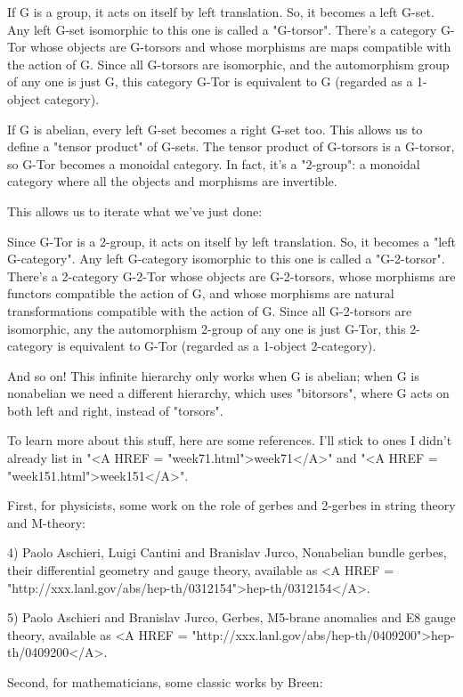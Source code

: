If G is a group, it acts on itself by left translation.  So, it
becomes a left G-set.  Any left G-set isomorphic to this one is called
a "G-torsor".  There's a category G-Tor whose objects are
G-torsors and whose morphisms are maps compatible with the action of
G.  Since all G-torsors are isomorphic, and the automorphism group of
any one is just G, this category G-Tor is equivalent to G (regarded as
a 1-object category).

If G is abelian, every left G-set becomes a right G-set too.  This
allows us to define a "tensor product" of G-sets.  The
tensor product of G-torsors is a G-torsor, so G-Tor becomes a monoidal
category.  In fact, it's a "2-group": a monoidal category
where all the objects and morphisms are invertible.

This allows us to iterate what we've just done:

Since G-Tor is a 2-group, it acts on itself by left translation.  So,
it becomes a "left G-category".  Any left G-category
isomorphic to this one is called a "G-2-torsor".  There's a
2-category G-2-Tor whose objects are G-2-torsors, whose morphisms are
functors compatible the action of G, and whose morphisms are natural
transformations compatible with the action of G.  Since all
G-2-torsors are isomorphic, any the automorphism 2-group of any one is
just G-Tor, this 2-category is equivalent to G-Tor (regarded as a
1-object 2-category).

And so on!  This infinite hierarchy only works when G is abelian;
when G is nonabelian we need a different hierarchy, which uses 
"bitorsors", where G acts on both left and right, instead 
of "torsors".  

To learn more about this stuff, here are some references.  I'll stick
to ones I didn't already list in "<A HREF =
"week71.html">week71</A>" and "<A HREF =
"week151.html">week151</A>".

First, for physicists, some work on the role of gerbes and 2-gerbes in 
string theory and M-theory:

4) Paolo Aschieri, Luigi Cantini and Branislav Jurco, Nonabelian bundle
gerbes, their differential geometry and gauge theory, available as 
<A HREF = "http://xxx.lanl.gov/abs/hep-th/0312154">hep-th/0312154</A>.

5) Paolo Aschieri and Branislav Jurco, Gerbes, M5-brane anomalies and
E8 gauge theory, available as <A HREF =
"http://xxx.lanl.gov/abs/hep-th/0409200">hep-th/0409200</A>.

Second, for mathematicians, some classic works by Breen:

